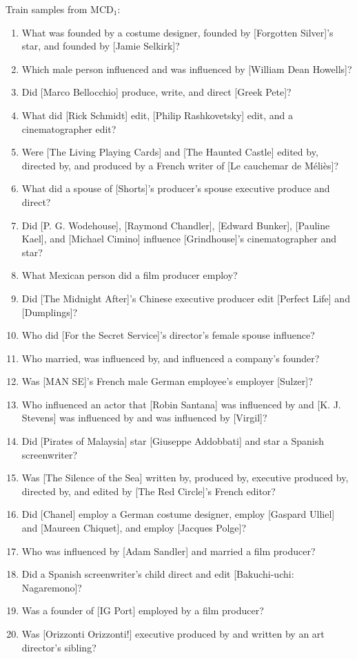 \documentclass[letterpaper]{article}
\newcommand{\MCD}[1]{MCD$_{#1}$}
\begin{document}
Train samples from \MCD{1}:
\begin{enumerate}
  \item What was founded by a costume designer, founded by [Forgotten Silver]'s star, and founded by [Jamie Selkirk]?
  \item Which male person influenced and was influenced by [William Dean Howells]?
  \item Did [Marco Bellocchio] produce, write, and direct [Greek Pete]?
  \item What did [Rick Schmidt] edit, [Philip Rashkovetsky] edit, and a cinematographer edit?
  \item Were [The Living Playing Cards] and [The Haunted Castle] edited by, directed by, and produced by a French writer of [Le cauchemar de M\'eli\`es]?
  \item What did a spouse of [Shorts]'s producer's spouse executive produce and direct?
  \item Did [P. G. Wodehouse], [Raymond Chandler], [Edward Bunker], [Pauline Kael], and [Michael Cimino] influence [Grindhouse]'s cinematographer and star?
  \item What Mexican person did a film producer employ?
  \item Did [The Midnight After]'s Chinese executive producer edit [Perfect Life] and [Dumplings]?
  \item Who did [For the Secret Service]'s director's female spouse influence?
  \item Who married, was influenced by, and influenced a company's founder?
  \item Was [MAN SE]'s French male German employee's employer [Sulzer]?
  \item Who influenced an actor that [Robin Santana] was influenced by and [K. J. Stevens] was influenced by and was influenced by [Virgil]?
  \item Did [Pirates of Malaysia] star [Giuseppe Addobbati] and star a Spanish screenwriter?
  \item Was [The Silence of the Sea] written by, produced by, executive produced by, directed by, and edited by [The Red Circle]'s French editor?
  \item Did [Chanel] employ a German costume designer, employ [Gaspard Ulliel] and [Maureen Chiquet], and employ [Jacques Polge]?
  \item Who was influenced by [Adam Sandler] and married a film producer?
  \item Did a Spanish screenwriter's child direct and edit [Bakuchi-uchi: Nagaremono]?
  \item Was a founder of [IG Port] employed by a film producer?
  \item Was [Orizzonti Orizzonti!] executive produced by and written by an art director's sibling?
\end{enumerate}
\end{document}
